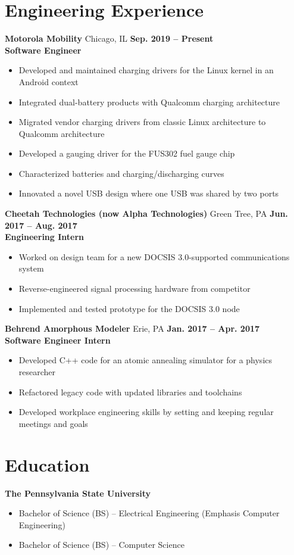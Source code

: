 \documentclass[letterpaper,10pt]{article}
\begin{document}
\section{Engineering Experience}
\textbf{Motorola Mobility} Chicago, IL \hfill \textbf{Sep. 2019 -- Present}\\
\textbf{Software Engineer}
\begin{itemize}
\item Developed and maintained charging drivers for the Linux kernel in an Android context
\item Integrated dual-battery products with Qualcomm charging architecture
\item Migrated vendor charging drivers from classic Linux architecture to Qualcomm architecture
\item Developed a gauging driver for the FUS302 fuel gauge chip
\item Characterized batteries and charging/discharging curves
\item Innovated a novel USB design where one USB was shared by two ports
\end{itemize}
\textbf{Cheetah Technologies (now Alpha Technologies)} Green Tree, PA \hfill \textbf{Jun. 2017 -- Aug. 2017}\\
\textbf{Engineering Intern}
\begin{itemize}
\item Worked on design team for a new DOCSIS 3.0-supported communications system
\item Reverse-engineered signal processing hardware from competitor
\item Implemented and tested prototype for the DOCSIS 3.0 node
\end{itemize}
\textbf{Behrend Amorphous Modeler} Erie, PA \hfill \textbf{Jan. 2017 -- Apr. 2017}\\
\textbf{Software Engineer Intern}
\begin{itemize}
\item Developed C++ code for an atomic annealing simulator for a physics researcher
\item Refactored legacy code with updated libraries and toolchains
\item Developed workplace engineering skills by setting and keeping regular meetings and goals
\end{itemize}

\section{Education}
\textbf{The Pennsylvania State University}
\begin{itemize}
\item Bachelor of Science (BS) -- Electrical Engineering (Emphasis Computer Engineering)
\item Bachelor of Science (BS) -- Computer Science
\end{itemize}
\end{document}
